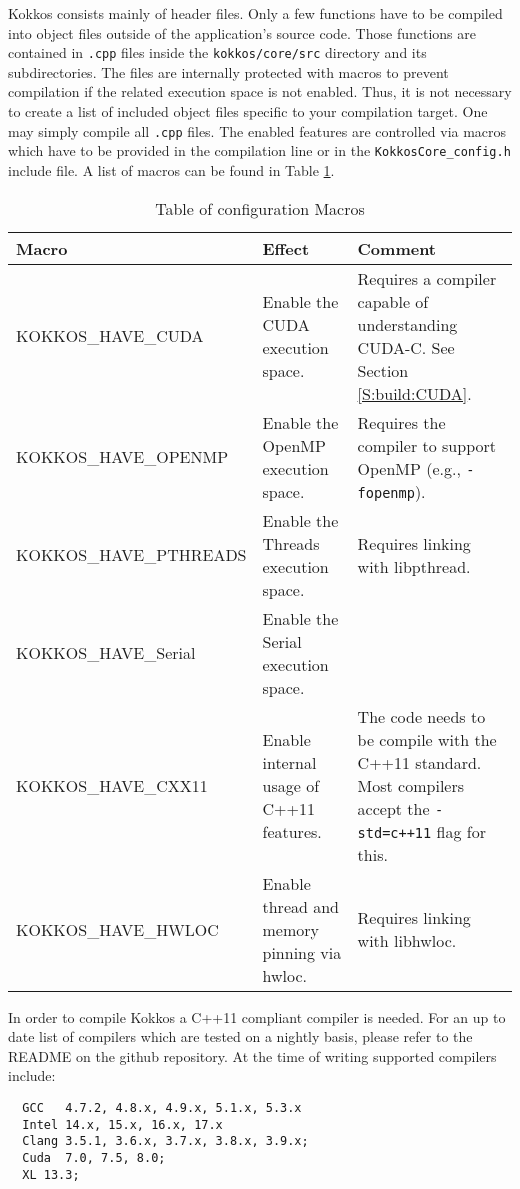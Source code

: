 Kokkos consists mainly of header files. 
Only a few functions have to be compiled into object files outside of the application's source code.
Those functions are contained in \verb!.cpp! files inside the \lstinline|kokkos/core/src| directory and its subdirectories.
The files are internally protected with macros to prevent compilation if the related execution space is not enabled. 
Thus, it is not necessary to create a list of included object files specific to your compilation target.
One may simply compile all \verb!.cpp! files. 
The enabled features are controlled via macros which have to be provided in the compilation line or in the \lstinline|KokkosCore_config.h| include file. 
A list of macros can be found in Table \ref{TBL:CompileMacros}.
\begin{table}
\caption{Table of configuration Macros}
\label{TBL:CompileMacros}
\begin{small}
\begin{tabular}[t]{p{}p{}p{}}
\hline\hline
Macro & Effect & Comment \\
\hline
{\tiny KOKKOS\_HAVE\_CUDA} & Enable the CUDA execution space. & Requires a compiler capable of understanding CUDA-C. See Section \ref{S:build:CUDA}. \\
{\tiny KOKKOS\_HAVE\_OPENMP} & Enable the OpenMP execution space. & Requires the compiler to support OpenMP (e.g., \verb!-fopenmp!). \\
{\tiny KOKKOS\_HAVE\_PTHREADS} & Enable the Threads execution space. & Requires linking with libpthread.\\
{\tiny KOKKOS\_HAVE\_Serial} & Enable the Serial execution space. & \\
{\tiny KOKKOS\_HAVE\_CXX11} & Enable internal usage of C++11 features. & The code needs to be compile with the C++11 standard. Most compilers accept the \verb!-std=c++11! flag for this.\\
{\tiny KOKKOS\_HAVE\_HWLOC} & Enable thread and memory pinning via hwloc. & Requires linking with libhwloc.\\
\hline\hline
\end{tabular}
\end{small}
\end{table}

In order to compile Kokkos a C++11 compliant compiler is needed. 
For an up to date list of compilers which are tested on a nightly basis, please refer to the README on the github repository. 
At the time of writing supported compilers include: 
\begin{lstlisting}
  GCC   4.7.2, 4.8.x, 4.9.x, 5.1.x, 5.3.x
  Intel 14.x, 15.x, 16.x, 17.x 
  Clang 3.5.1, 3.6.x, 3.7.x, 3.8.x, 3.9.x; 
  Cuda  7.0, 7.5, 8.0; 
  XL 13.3;
\end{lstlisting}

